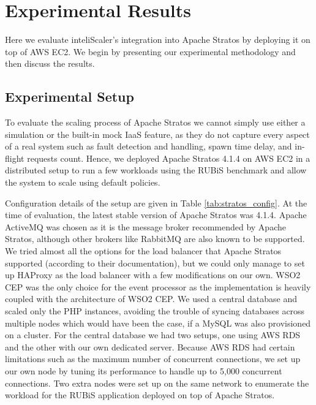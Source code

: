 \section{Experimental Results}
Here we evaluate inteliScaler's integration into Apache Stratos by deploying it on top of AWS EC2. We begin by presenting our experimental methodology and then discuss the results.

\subsection{Experimental Setup}
To evaluate the scaling process of Apache Stratos we cannot simply use either a simulation or the built-in mock IaaS feature, as they do not capture every aspect of a real system such as fault detection and handling, spawn time delay, and in-flight requests count. Hence, we deployed Apache Stratos 4.1.4 on AWS EC2 in a distributed setup to run a few workloads using the RUBiS benchmark and allow the system to scale using default policies.

Configuration details of the setup are given in Table \ref{tab:stratos_config}. At the time of evaluation, the latest stable version of Apache Stratos was 4.1.4. Apache ActiveMQ was chosen as it is the message broker recommended by Apache Stratos, although other brokers like RabbitMQ are also known to be supported. We tried almost all the options for the load balancer that Apache Stratos supported (according to their documentation), but we could only manage to set up HAProxy as the load balancer with a few modifications on our own. WSO2 CEP was the only choice for the event processor as the implementation is heavily coupled with the architecture of WSO2 CEP. We used a central database and scaled only the PHP instances, avoiding the trouble of syncing databases across multiple nodes which would have been the case, if a MySQL was also provisioned on a cluster. For the central database we had two setups, one using AWS RDS and the other with our own dedicated server. Because AWS RDS had certain limitations such as the maximum number of concurrent connections, we set up our own node by tuning its performance to handle up to 5,000 concurrent connections. Two extra nodes were set up on the same network to enumerate the workload for the RUBiS application deployed on top of Apache Stratos.


